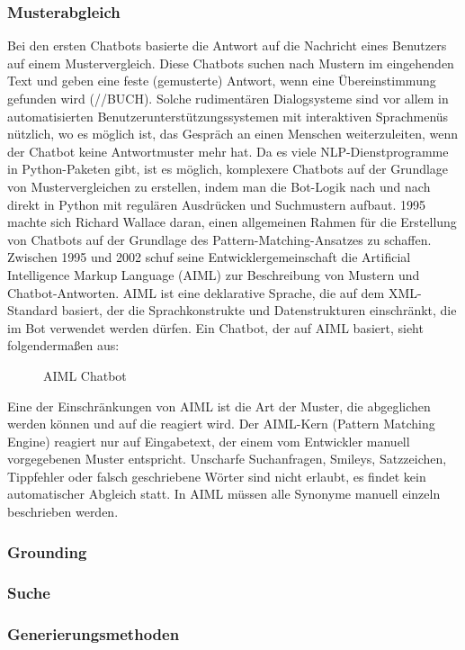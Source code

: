 \subsubsection{Musterabgleich}
Bei den ersten Chatbots basierte die Antwort auf die Nachricht eines Benutzers auf einem Mustervergleich. Diese Chatbots suchen nach Mustern im eingehenden Text und geben eine feste (gemusterte) Antwort, wenn eine Übereinstimmung gefunden wird (//BUCH).
Solche rudimentären Dialogsysteme sind vor allem in automatisierten Benutzerunterstützungssystemen mit interaktiven Sprachmenüs nützlich, wo es möglich ist, das Gespräch an einen Menschen weiterzuleiten, wenn der Chatbot keine Antwortmuster mehr hat.
Da es viele NLP-Dienstprogramme in Python-Paketen gibt, ist es möglich, komplexere Chatbots auf der Grundlage von Mustervergleichen zu erstellen, indem man die Bot-Logik nach und nach direkt in Python mit regulären Ausdrücken und Suchmustern aufbaut.
1995 machte sich Richard Wallace daran, einen allgemeinen Rahmen für die Erstellung von Chatbots auf der Grundlage des Pattern-Matching-Ansatzes zu schaffen. Zwischen 1995 und 2002 schuf seine Entwicklergemeinschaft die Artificial Intelligence Markup Language (AIML) zur Beschreibung von Mustern und Chatbot-Antworten.
AIML ist eine deklarative Sprache, die auf dem XML-Standard basiert, der die Sprachkonstrukte und Datenstrukturen einschränkt, die im Bot verwendet werden dürfen. Ein Chatbot, der auf AIML basiert, sieht folgendermaßen aus:
\begin{figure}[H]
    \centering
    \caption{\label{figure:Aiml_Bot}AIML Chatbot}
\end{figure}
\noindent
Eine der Einschränkungen von AIML ist die Art der Muster, die abgeglichen werden können und auf die reagiert wird. Der AIML-Kern (Pattern Matching Engine) reagiert nur auf Eingabetext, der einem vom Entwickler manuell vorgegebenen Muster entspricht. Unscharfe Suchanfragen, Smileys, Satzzeichen, Tippfehler oder falsch geschriebene Wörter sind nicht erlaubt, es findet kein automatischer Abgleich statt. In AIML müssen alle Synonyme manuell einzeln beschrieben werden.
\subsubsection{Grounding}
\subsubsection{Suche}
\subsubsection{Generierungsmethoden}
\endinput